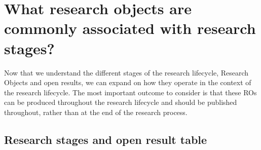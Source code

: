 \documentclass[
  letterpaper,
  DIV=11,
  numbers=noendperiod]{scrreport}
\begin{document}
\hypertarget{what-research-objects-are-commonly-associated-with-research-stages}{%
\section{What research objects are commonly associated with research
stages?}\label{what-research-objects-are-commonly-associated-with-research-stages}}

Now that we understand the different stages of the research lifecycle,
Research Objects and open results, we can expand on how they operate in
the context of the research lifecycle. The most important outcome to
consider is that these ROs can be produced throughout the research
lifecycle and should be published throughout, rather than at the end of
the research process.

\hypertarget{research-stages-and-open-result-table}{%
\subsection{Research stages and open result
table}\label{research-stages-and-open-result-table}}
\end{document}
